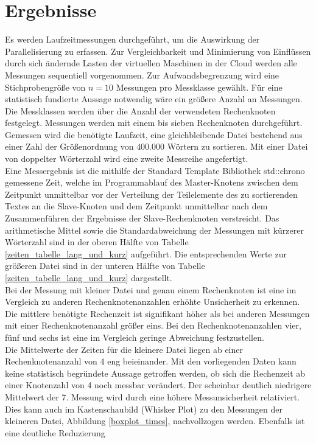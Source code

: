 \section{Ergebnisse}
Es werden Laufzeitmessungen durchgeführt, um die Auswirkung der Parallelisierung zu erfassen. Zur Vergleichbarkeit und Minimierung von Einflüssen durch sich ändernde Lasten der virtuellen Maschinen in der Cloud werden alle Messungen sequentiell vorgenommen. Zur Aufwandsbegrenzung wird eine Stichprobengröße von $n = 10$ Messungen pro Messklasse gewählt. Für eine statistisch fundierte Aussage notwendig wäre ein größere Anzahl an Messungen. Die Messklassen werden über die Anzahl der verwendeten Rechenknoten festgelegt. Messungen werden mit einem bis sieben Rechenknoten durchgeführt. Gemessen wird die benötigte Laufzeit, eine gleichbleibende Datei bestehend aus einer Zahl der Größenordnung von $400.000$ Wörtern zu sortieren. Mit einer Datei von doppelter Wörterzahl wird eine zweite Messreihe angefertigt.
\\
Eine Messergebnis ist die mithilfe der Standard Template Bibliothek std::chrono gemessene Zeit, welche im Programmablauf des Master-Knotens zwischen dem Zeitpunkt unmittelbar vor der Verteilung der Teilelemente 
des zu sortierenden Textes an die Slave-Knoten und dem Zeitpunkt unmittelbar nach dem Zusammenführen der Ergebnisse der Slave-Rechenknoten verstreicht.
Das arithmetische Mittel sowie die Standardabweichung der Messungen mit kürzerer Wörterzahl sind in der oberen Hälfte von Tabelle \ref{zeiten_tabelle_lang_und_kurz} aufgeführt. Die entsprechenden Werte zur größeren Datei sind in der unteren Hälfte von Tabelle \ref{zeiten_tabelle_lang_und_kurz} dargestellt.
\\
Bei der Messung mit kleiner Datei und genau einem Rechenknoten ist eine im Vergleich zu anderen Rechenknotenanzahlen erhöhte Unsicherheit zu erkennen. Die mittlere benötigte Rechenzeit ist signifikant höher als bei anderen Messungen mit einer Rechenknotenanzahl größer eins. Bei den Rechenknotenanzahlen vier, fünf und sechs ist eine im Vergleich geringe Abweichung festzustellen.
\\
Die Mittelwerte der Zeiten für die kleinere Datei liegen ab einer Rechenknotenanzahl von 4 eng beieinander. Mit den vorliegenden Daten kann keine statistisch begründete Aussage getroffen werden, ob sich die Rechenzeit ab einer Knotenzahl von 4 noch messbar verändert. Der scheinbar deutlich niedrigere Mittelwert der 7. Messung wird durch eine höhere Messunsicherheit relativiert.
\\
Dies kann auch im Kastenschaubild (Whisker Plot) zu den Messungen der kleineren Datei, Abbildung \ref{boxplot_times}, nachvollzogen werden. Ebenfalls ist eine deutliche Reduzierung 
